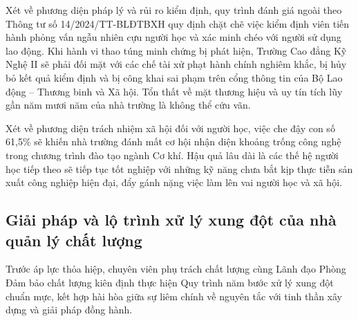 Xét về phương diện pháp lý và rủi ro kiểm định, quy trình đánh giá ngoài theo Thông tư số 14/2024/TT-BLĐTBXH quy định chặt chẽ việc kiểm định viên tiến hành phỏng vấn ngẫu nhiên cựu người học và xác minh chéo với người sử dụng lao động. Khi hành vi thao túng minh chứng bị phát hiện, Trường Cao đẳng Kỹ Nghệ II sẽ phải đối mặt với các chế tài xử phạt hành chính nghiêm khắc, bị hủy bỏ kết quả kiểm định và bị công khai sai phạm trên cổng thông tin của Bộ Lao động -- Thương binh và Xã hội. Tổn thất về mặt thương hiệu và uy tín tích lũy gần năm mươi năm của nhà trường là không thể cứu vãn.

Xét về phương diện trách nhiệm xã hội đối với người học, việc che đậy con số 61,5\% sẽ khiến nhà trường đánh mất cơ hội nhận diện khoảng trống công nghệ trong chương trình đào tạo ngành Cơ khí. Hậu quả lâu dài là các thế hệ người học tiếp theo sẽ tiếp tục tốt nghiệp với những kỹ năng chưa bắt kịp thực tiễn sản xuất công nghiệp hiện đại, đẩy gánh nặng việc làm lên vai người học và xã hội.

\subsection{Giải pháp và lộ trình xử lý xung đột của nhà quản lý chất lượng}

Trước áp lực thỏa hiệp, chuyên viên phụ trách chất lượng cùng Lãnh đạo Phòng Đảm bảo chất lượng kiên định thực hiện Quy trình năm bước xử lý xung đột chuẩn mực, kết hợp hài hòa giữa sự liêm chính về nguyên tắc với tinh thần xây dựng và giải pháp đồng hành.

